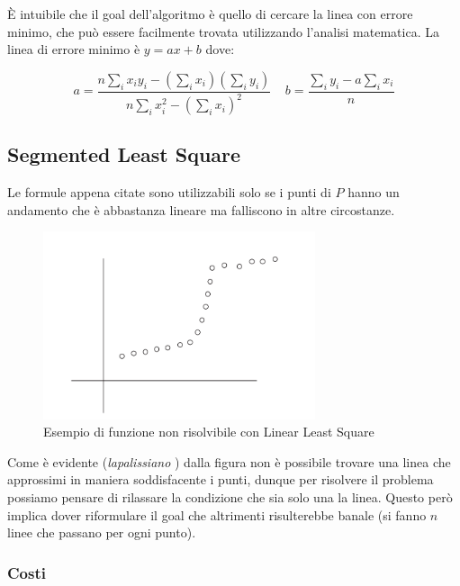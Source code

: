 \subsubsection{\goal}

È intuibile che il goal dell'algoritmo è quello di cercare la linea con errore
minimo, che può essere facilmente trovata utilizzando l'analisi matematica.
La linea di errore minimo è $y = ax + b$ dove:

\[
    a = \frac{n \sum_{i} x_i y_i - (\sum_{i} x_i) (\sum_{i} y_i)}{n \sum_{i} x_i^2 - (\sum_{i} x_i)^2} \ \ \  \ \ b = \frac{\sum_{i} y_i - a \sum_{i} x_i}{n}
\]

\subsection{Segmented Least Square}

Le formule appena citate sono utilizzabili solo se i punti di $P$ hanno un
andamento che è abbastanza lineare ma falliscono in altre circostanze.

\begin{figure}[H]
    \centering
    \includegraphics[width=8cm, keepaspectratio]{capitoli/dynamic_programming/imgs/segmente_linear_least.png}
    \caption{Esempio di funzione non risolvibile con Linear Least Square}
\end{figure}

Come è evidente (\textit{lapalissiano }) dalla figura
non è possibile trovare una linea che approssimi in maniera soddisfacente i
punti, dunque per risolvere il problema possiamo pensare di rilassare la
condizione che sia solo una la linea. Questo però implica dover riformulare il
goal che altrimenti risulterebbe banale (si fanno $n$ linee che passano per ogni
punto).

\subsubsection{Costi}

